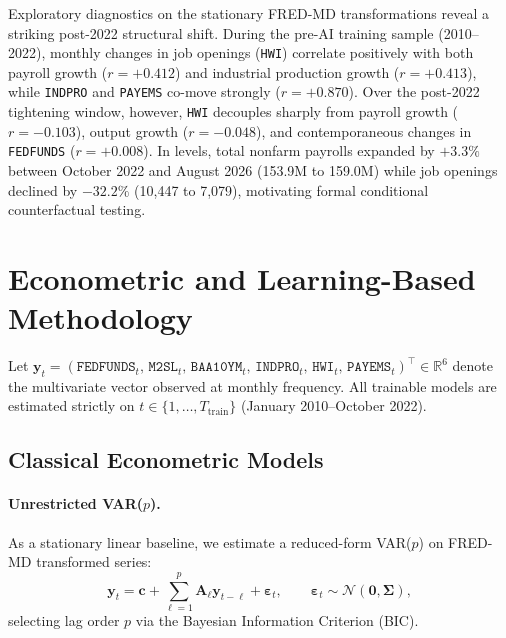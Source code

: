 \documentclass[11pt,a4paper]{article}
\begin{document}
Exploratory diagnostics on the stationary FRED-MD transformations reveal a striking post-2022 structural shift. During the pre-AI training sample (2010--2022), monthly changes in job openings (\texttt{HWI}) correlate positively with both payroll growth ($r = +0.412$) and industrial production growth ($r = +0.413$), while \texttt{INDPRO} and \texttt{PAYEMS} co-move strongly ($r = +0.870$). Over the post-2022 tightening window, however, \texttt{HWI} decouples sharply from payroll growth ($r = -0.103$), output growth ($r = -0.048$), and contemporaneous changes in \texttt{FEDFUNDS} ($r = +0.008$). In levels, total nonfarm payrolls expanded by $+3.3\%$ between October 2022 and August 2026 (153.9M to 159.0M) while job openings declined by $-32.2\%$ (10,447 to 7,079), motivating formal conditional counterfactual testing.

\section{Econometric and Learning-Based Methodology}
\label{sec:methodology}

Let $\mathbf{y}_t = (\texttt{FEDFUNDS}_t,\, \texttt{M2SL}_t,\, \texttt{BAA10YM}_t,\, \texttt{INDPRO}_t,\, \texttt{HWI}_t,\, \texttt{PAYEMS}_t)^\top \in \mathbb{R}^6$ denote the multivariate vector observed at monthly frequency. All trainable models are estimated strictly on $t \in \{1,\dots,T_{\text{train}}\}$ (January 2010--October 2022).

\subsection{Classical Econometric Models}

\paragraph{Unrestricted VAR($p$).}
As a stationary linear baseline, we estimate a reduced-form VAR($p$) on FRED-MD transformed series:
\begin{equation}
  \mathbf{y}_t = \mathbf{c} + \sum_{\ell=1}^{p} \mathbf{A}_\ell \mathbf{y}_{t-\ell} + \boldsymbol{\varepsilon}_t,
  \qquad \boldsymbol{\varepsilon}_t \sim \mathcal{N}(\mathbf{0}, \boldsymbol{\Sigma}),
  \label{eq:var}
\end{equation}
selecting lag order $p$ via the Bayesian Information Criterion (BIC).
\end{document}
